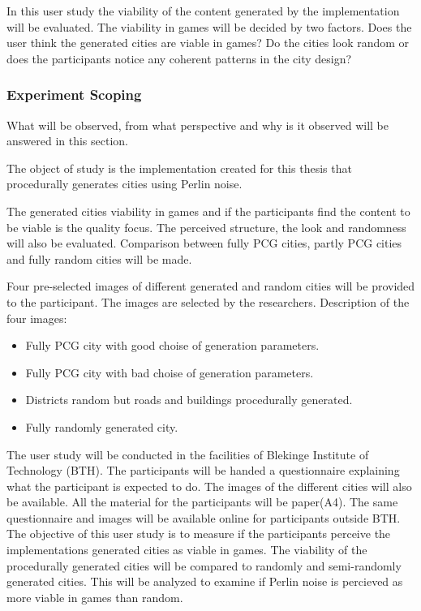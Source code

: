 			In this user study the viability of the content generated by the implementation will be evaluated.  The viability in games will be decided by two factors. Does the user think the generated cities are viable in games? Do the cities look random or does the participants notice any coherent patterns in the city design?
			
		
		\subsubsection{Experiment Scoping}
		What will be observed, from what perspective and why is it observed will be answered in this section.
		
			The object of study is the implementation created for this thesis that procedurally generates cities using Perlin noise.
			
			The generated cities viability in games and if the participants find the content to be viable is the quality focus. The perceived structure, the look and randomness will also be evaluated. Comparison between fully PCG cities, partly PCG cities and fully random cities will be made.
			
			Four pre-selected images of different generated and random cities will be provided to the participant. The images are selected by the researchers. Description of the four images:
			\begin{itemize}
				\item Fully PCG city with good choise of generation parameters.
				\item Fully PCG city with bad choise of generation parameters.
				\item Districts random but roads and buildings procedurally generated.
				\item Fully randomly generated city.
			\end{itemize}
			
			
			
			The user study will be conducted in the facilities of Blekinge Institute of Technology (BTH). The participants will be handed a questionnaire explaining what the participant is expected to do. The images of the different cities will also be available. All the material for the participants will be paper(A4). The same questionnaire and images will be available online for participants outside BTH.
			The objective of this user study is to measure if the participants perceive the implementations generated cities as viable in games. The viability of the procedurally generated cities will be compared to randomly and semi-randomly generated cities. This will be analyzed to examine if Perlin noise is percieved as more viable in games than random.
	
